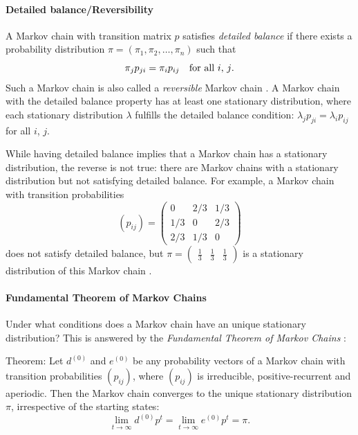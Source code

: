 \paragraph{Detailed balance/Reversibility}

A Markov chain with transition matrix $p$ satisfies \emph{detailed
balance}\emph{ }if there exists a probability
distribution $\pi=(\pi_{1},\pi_{2},\dots,\pi_{n})$ such that 
\[
\pi_{j}p_{ji}=\pi_{i}p_{ij}\ \ \ \mbox{for all \ensuremath{i}, \ensuremath{j}}.
\]
Such a Markov chain is also called a \emph{reversible} Markov chain
\cite{Norris1997}. A Markov chain with the detailed balance property
has at least one stationary distribution, where each stationary distribution
$\lambda$ fulfills the detailed balance condition: $\lambda_{j}p_{ji}=\lambda_{i}p_{ij}$
for all $i$, $j$.

While having detailed balance implies that a Markov chain has a stationary
distribution, the reverse is not true: there are Markov chains with
a stationary distribution but not satisfying detailed balance. For
example, a Markov chain with transition probabilities 
\[
(p_{ij})=\left(\begin{array}{ccc}
0 & 2/3 & 1/3\\
1/3 & 0 & 2/3\\
2/3 & 1/3 & 0
\end{array}\right)
\]
does not satisfy detailed balance, but $\pi=\left(\begin{array}{ccc}
\frac{1}{3} & \frac{1}{3} & \frac{1}{3}\end{array}\right)$ is a stationary distribution of this Markov chain \cite{Norris1997}.

\paragraph{Fundamental Theorem of Markov Chains\label{par:Fundamental-Theorem-of-Markov-Chains}}

Under what conditions does a Markov chain have an unique stationary
distribution? This is answered by the \emph{Fundamental Theorem of
Markov Chains} \cite{Behrends2000}:

Theorem: Let $d^{(0)}$ and $e^{(0)}$ be any probability vectors
of a Markov chain with transition probabilities $(p_{ij})$, where
$(p_{ij})$ is irreducible, positive-recurrent and aperiodic. Then
the Markov chain converges to the unique stationary distribution $\pi$,
irrespective of the starting states:
\[
\lim_{t\rightarrow\infty}d^{(0)}p^{t}=\lim_{t\rightarrow\infty}e^{(0)}p^{t}=\pi.
\]

